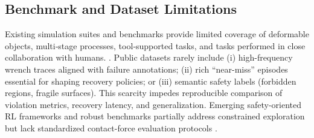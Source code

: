 \documentclass[Afour,sageh,times]{template/sagej}
\begin{document}
     
    \subsection{Benchmark and Dataset Limitations}
    Existing simulation suites and benchmarks provide limited coverage of deformable objects, multi‑stage processes, tool‑supported tasks, and tasks performed in close collaboration with humans. \citep{towers2024gymnasium,geng2025roboverse,gu2025robust}. Public datasets rarely include (i) high-frequency wrench traces aligned with failure annotations; (ii) rich “near-miss” episodes essential for shaping recovery policies; or (iii) semantic safety labels (forbidden regions, fragile surfaces). This scarcity impedes reproducible comparison of violation metrics, recovery latency, and generalization. Emerging safety-oriented RL frameworks and robust benchmarks partially address constrained exploration but lack standardized contact-force evaluation protocols \citep{152,raffin2021stable}.
    
\end{document}
